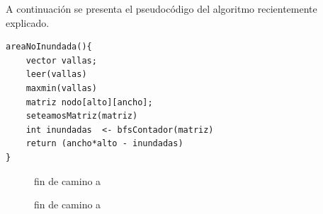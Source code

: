 \documentclass[a4paper, 12pt]{article}
\begin{document}
A continuaci\'on se presenta el pseudoc\'odigo del algoritmo recientemente explicado.

\begin{verbatim}
areaNoInundada(){
	vector vallas;
	leer(vallas)
	maxmin(vallas)
	matriz nodo[alto][ancho];
	seteamosMatriz(matriz)
	int inundadas  <- bfsContador(matriz)
	return (ancho*alto - inundadas)
}
\end{verbatim}
\begin{figure}[H]
\centering
{}
\qquad
{}
\caption{fin de camino a}
\end{figure}

\begin{figure}[H]
\centering
{}
\qquad
{}
\qquad
{}
\caption{fin de camino a}
\end{figure}
\end{document}
